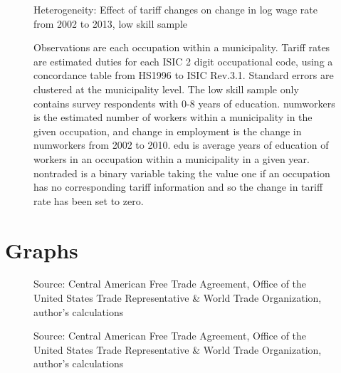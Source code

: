 \documentclass[12pt]{article}
\begin{document}
\begin{landscape}
\begin{figure}[H]
\begin{center}
Heterogeneity: Effect of tariff changes on change in log wage rate from 2002 to 2013, low skill sample

\caption{\label{fig:Table5}}
\end{center}
\small{Observations are each occupation within a municipality. 
Tariff rates are estimated duties for each ISIC 2 digit occupational code,
using a concordance table from HS1996 to ISIC Rev.3.1. Standard errors are clustered at the 
municipality level. The low skill sample only 
contains survey respondents with 0-8 years of education. numworkers is the estimated
number of workers within a municipality in the given occupation, and change in employment
is the change in numworkers from 2002 to 2010. edu is average years of education 
of workers in an occupation within a municipality in a given year. nontraded is a binary variable
taking the value one if an occupation has no corresponding tariff information and so the change in
tariff rate has been set to zero.}
\end{figure}
\end{landscape}

\section{Graphs}
\label{sec:Graphs}

\begin{figure}[H]
 
\caption{\label{fig:Graph1}}
Source: Central American Free Trade Agreement, Office of the United States Trade Representative \&
World Trade Organization, author's calculations
\end{figure}

\begin{figure}[H]

\caption{\label{fig:Graph2}}
Source: Central American Free Trade Agreement, Office of the United States Trade Representative \&
World Trade Organization, author's calculations
\end{figure}
\end{document}
